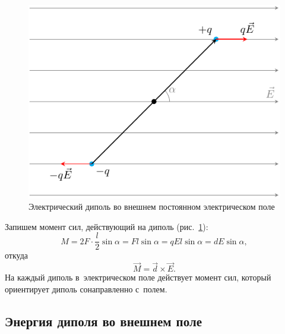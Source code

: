 	\begin{figure}[h!]
		\label{fig:dipole2}
		\centering
		\includegraphics[scale=1.25]{./img/dipole2/dipole2.pdf}
		\caption{Электрический диполь во внешнем постоянном электрическом поле}
	\end{figure}
	Запишем момент сил, действующий на диполь (рис.~\ref{fig:dipole2}):
		$$M=2F\cdot\frac{l}{2}\sin{\alpha}=Fl\sin{\alpha}=qEl\sin{\alpha}=dE\sin{\alpha},$$
	откуда
	\begin{equation}
		\vec{M}=\vec{d}\times\vec{E}.
	\end{equation}
	На каждый диполь в~электрическом поле действует момент сил, который ориентирует диполь сонаправленно с~полем.

		\subsection{Энергия диполя во внешнем поле}

